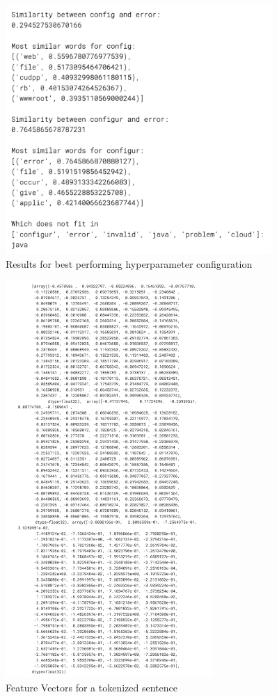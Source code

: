 \documentclass[english,bachelor]{swsLeipzig}
\begin{document}
\begin{figure}[h]
  \centering
  \includegraphics[width=0.9\textwidth]{images/bestword2vec.png}
  \caption{Results for best performing hyperparameter configuration}
  \label{fig:figure56}
\end{figure}

\begin{figure}[h]
  \centering
  \includegraphics[width=0.7\textwidth]{images/sentence.png}
  \caption{Feature Vectors for a tokenized sentence}
  \label{fig:appendix1}
\end{figure}
\end{document}
